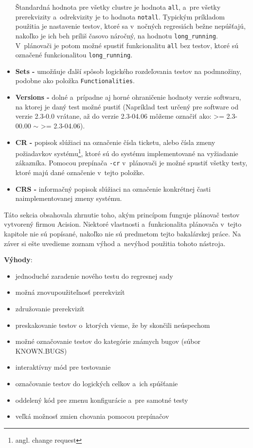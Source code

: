 \begin{itemize}
Štandardná hodnota pre všetky clustre je hodnota \texttt{all}, a~pre všetky prerekvizity a~odrekvizity je to hodnota \texttt{notall}.
Typickým príkladom použitia je nastavenie testov, ktoré sa v~nočných regresiách bežne nepúšťajú, 
nakoľko je ich beh príliš časovo náročný, na hodnotu \texttt{long\_running}.
V~plánovači je potom možné spustiť funkcionalitu \texttt{all} bez testov, ktoré sú označené funkcionalitou \texttt{long\_running}.
\item \textbf{Sets -} umožňuje ďalší spôsob logického rozdeľovania testov na podmnožiny, podobne ako položka \texttt{Functionalities}.
\item \textbf{Versions -} dolné a~prípadne aj horné ohraničenie hodnoty verzie softwaru, na ktorej je daný test možné pustiť
(Napríklad test určený pre software od verzie 2.3-0.0 vrátane, až do verzie 2.3-04.06 môžeme označiť ako: \textgreater= 2.3-00.00 $\sim$ \textgreater= 2.3-04.06).
\item \textbf{CR -} popisok slúžiaci na označenie čísla ticketu, alebo čísla zmeny požiadavkov systému\footnote{angl. change request}, ktoré sú do systému implementované
na vyžiadanie zákazníka. 
Pomocou prepínača \texttt{-cr} v~plánovači je možné spustiť všetky testy, ktoré majú dané označenie v~tejto položke.
\item \textbf{CRS -} informačný popisok slúžiaci na označenie konkrétnej časti naimplementovanej zmeny systému. 
\end{itemize}


Táto sekcia obsahovala zhrnutie toho, akým princípom funguje plánovač testov vytvorený firmou Acision.
Niektoré vlastnosti a~funkcionalita plánovača v~tejto kapitole nie sú popísané, nakoľko nie sú predmetom tejto bakalárskej práce. 
Na záver si ešte uvedieme zoznam výhod a~nevýhod použitia tohoto nástroja.

\noindent \textbf{Výhody}:
\begin{itemize}
\item jednoduché zaradenie nového testu do regresnej sady
\item možná znovupoužiteľnosť prerekvizít
\item združovanie prerekvizít
\item preskakovanie testov o~ktorých vieme, že by skončili neúspechom
\item možné označovanie testov do kategórie známych bugov (súbor KNOWN.BUGS)
\item interaktívny mód pre testovanie
\item označovanie testov do logických celkov a~ich spúšťanie
\item oddelený kód pre zmenu konfigurácie a~pre samotné testy
\item veľká možnosť zmien chovania pomocou prepínačov
\end{itemize} 

